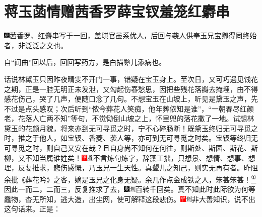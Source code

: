 

\chapter{蒋玉菡情赠茜香罗\hspace{.5em}薛宝钗羞笼红麝串}

{\includegraphics[width=3mm]{../Images/00004}\kaishu 茜香罗、红麝串写于一回，盖琪官虽系优人，后回与袭人供奉玉兄宝卿得同终始者，非泛泛之文也。}

{\kaishu 自``闻曲''回以后，回回写药方，是白描颦儿添病也。}

话说林黛玉只因昨夜晴雯不开门一事，错疑在宝玉身上。至次日，又可巧遇见饯花之期，正是一腔无明正未发泄，又勾起伤春愁思，因把些残花落瓣去掩埋，由不得感花伤己，哭了几声，便随口念了几句。不想宝玉在山坡上，听见是黛玉之声，先不过是点头感叹；次后听到``侬今葬花人笑痴，他年葬侬知是谁''，``一朝春尽红颜老，花落人亡两不知''等句，不觉恸倒山坡之上，怀里兜的落花撒了一地。试想林黛玉的花颜月貌，将来亦到无可寻觅之时，宁不心碎肠断！既黛玉终归无可寻觅之时，推之于他人，如宝钗、香菱、袭人等，亦可到无可寻觅之时矣。宝钗等终归无可寻觅之时，则自己又安在哉？且自身尚不知何在何往，则斯处、斯园、斯花、斯柳，又不知当属谁姓矣！{\includegraphics[width=3mm]{../Images/00002}\includegraphics[width=3mm]{../Images/00010}\footnotesize \kaishu 不言炼句炼字，辞藻工拙，只想景、想情、想事、想理，反复推求，悲伤感慨，乃玉兄一生天性。真颦儿之知己，则实无再有者。昨阻余批《葬花吟》之客，嫡是玉兄之化身无疑。余几作点金成铁之人，笨甚笨甚！}\href{../Text/part0032_split_000.html\#lnkback_1_a}{\textsuperscript{①}}因此一而二，二而三，反复推求了去，{\includegraphics[width=3mm]{../Images/00004}\includegraphics[width=3mm]{../Images/00011}\footnotesize \kaishu 百转千回矣。}真不知此时此际欲为何等蠢物，杳无所知，逃大造，出尘网，使可解释这段悲伤。{\includegraphics[width=3mm]{../Images/00002}\includegraphics[width=3mm]{../Images/00011}\footnotesize \kaishu 非大善知识，说不出这句话来。}正是：

